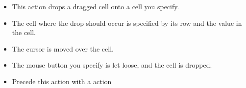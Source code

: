 
\begin{itemize}
\item This action drops a dragged cell onto a cell you specify.
\item The cell where the drop should occur is specified by its row and the value in the cell.
\item The cursor is moved over the cell.
\item The mouse button you specify is let loose, and the cell is dropped. 
\item Precede this action with a  action
\end{itemize}

